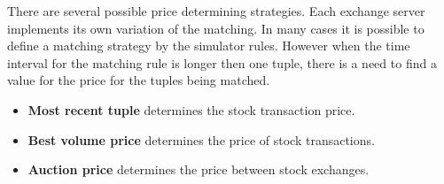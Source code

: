 \documentclass{article}
\begin{document}
There are several possible price determining strategies. Each exchange server implements its own variation of the matching. In many cases it is possible to define a matching strategy by the simulator rules. However when the time interval for the matching rule is longer then one tuple, there is a need to find a value for the price for the tuples being matched.

\begin{itemize}
    \item {\bf Most recent tuple} determines the stock transaction price.
    \item {\bf Best volume price} determines the price of stock transactions.  
    \item {\bf Auction price} determines the price between stock exchanges.
\end{itemize}
\end{document}
